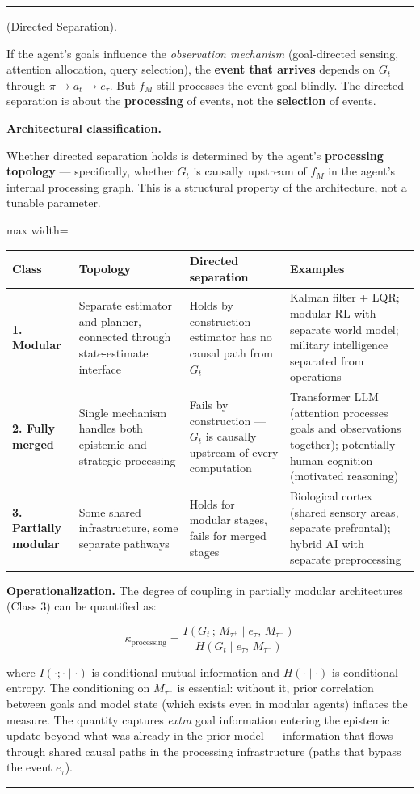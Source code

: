 \documentclass[11pt,oneside]{article}
\newcounter{claim}[section]
\renewcommand{\theclaim}{\thesection.\arabic{claim}}
\newenvironment{segment}[2]{%
  \refstepcounter{claim}%
  \bigskip\noindent\hrule\smallskip
  \noindent{\bfseries #1~\theclaim}\enskip(#2).\par\smallskip
  \noindent\ignorespaces
}{%
  \par\smallskip\noindent\hrule\bigskip
}
\newenvironment{proposition}[1][]{\begin{segment}{Proposition}{#1}}{\end{segment}}
\begin{document}
\begin{proposition}[Directed Separation]
If the agent's goals influence the \textit{observation mechanism} (goal-directed sensing, attention allocation, query selection), the \textbf{event that arrives} depends on $G_t$ through $\pi \to a_t \to e_\tau$. But $f_M$ still processes the event goal-blindly. The directed separation is about the \textbf{processing} of events, not the \textbf{selection} of events.


\medskip\noindent\textbf{Architectural classification.}



Whether directed separation holds is determined by the agent's \textbf{processing topology} — specifically, whether $G_t$ is causally upstream of $f_M$ in the agent's internal processing graph. This is a structural property of the architecture, not a tunable parameter.

\begin{adjustbox}{max width=\textwidth}
\small
\begin{tabular}{llll}
\toprule
Class & Topology & Directed separation & Examples \\
\midrule
\textbf{1. Modular} & Separate estimator and planner, connected through state-estimate interface & Holds by construction — estimator has no causal path from $G_t$ & Kalman filter + LQR; modular RL with separate world model; military intelligence separated from operations \\
\textbf{2. Fully merged} & Single mechanism handles both epistemic and strategic processing & Fails by construction — $G_t$ is causally upstream of every computation & Transformer LLM (attention processes goals and observations together); potentially human cognition (motivated reasoning) \\
\textbf{3. Partially modular} & Some shared infrastructure, some separate pathways & Holds for modular stages, fails for merged stages & Biological cortex (shared sensory areas, separate prefrontal); hybrid AI with separate preprocessing \\
\bottomrule
\end{tabular}
\end{adjustbox}


\textbf{Operationalization.} The degree of coupling in partially modular architectures (Class 3) can be quantified as:


$$\kappa_{\text{processing}} = \frac{I(G_t \,;\, M_{\tau^+} \mid e_\tau,\, M_{\tau^-})}{H(G_t \mid e_\tau,\, M_{\tau^-})}$$

where $I(\cdot;\cdot\mid\cdot)$ is conditional mutual information and $H(\cdot\mid\cdot)$ is conditional entropy. The conditioning on $M_{\tau^-}$ is essential: without it, prior correlation between goals and model state (which exists even in modular agents) inflates the measure. The quantity captures \textit{extra} goal information entering the epistemic update beyond what was already in the prior model — information that flows through shared causal paths in the processing infrastructure (paths that bypass the event $e_\tau$).


\end{proposition}
\end{document}
